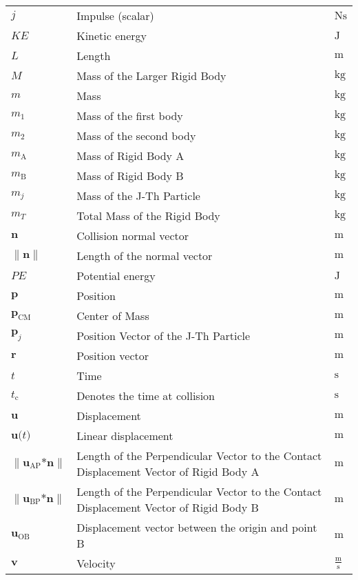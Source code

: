 \documentclass[12pt]{article}
\begin{document}
\begin{longtabu}{l X[l] l}
$j$ & Impulse (scalar) & $\text{N}\text{s}$
\\
$KE$ & Kinetic energy & ${\text{J}}$
\\
$L$ & Length & ${\text{m}}$
\\
$M$ & Mass of the Larger Rigid Body & ${\text{kg}}$
\\
$m$ & Mass & ${\text{kg}}$
\\
${m_{1}}$ & Mass of the first body & ${\text{kg}}$
\\
${m_{2}}$ & Mass of the second body & ${\text{kg}}$
\\
${m_{\text{A}}}$ & Mass of Rigid Body A & ${\text{kg}}$
\\
${m_{\text{B}}}$ & Mass of Rigid Body B & ${\text{kg}}$
\\
${m_{j}}$ & Mass of the J-Th Particle & ${\text{kg}}$
\\
${m_{T}}$ & Total Mass of the Rigid Body & ${\text{kg}}$
\\
$\symbf{n}$ & Collision normal vector & ${\text{m}}$
\\
$\|\symbf{n}\|$ & Length of the normal vector & ${\text{m}}$
\\
$PE$ & Potential energy & ${\text{J}}$
\\
$\symbf{p}$ & Position & ${\text{m}}$
\\
${\symbf{p}_{\text{CM}}}$ & Center of Mass & ${\text{m}}$
\\
${\symbf{p}_{j}}$ & Position Vector of the J-Th Particle & ${\text{m}}$
\\
$\symbf{r}$ & Position vector & ${\text{m}}$
\\
$t$ & Time & ${\text{s}}$
\\
${t_{\text{c}}}$ & Denotes the time at collision & ${\text{s}}$
\\
$\symbf{u}$ & Displacement & ${\text{m}}$
\\
$\symbf{u}\text{(}t\text{)}$ & Linear displacement & ${\text{m}}$
\\
$\|{\symbf{u}_{\text{A}\text{P}}}\text{*}\symbf{n}\|$ & Length of the Perpendicular Vector to the Contact Displacement Vector of Rigid Body A & ${\text{m}}$
\\
$\|{\symbf{u}_{\text{B}\text{P}}}\text{*}\symbf{n}\|$ & Length of the Perpendicular Vector to the Contact Displacement Vector of Rigid Body B & ${\text{m}}$
\\
${\symbf{u}_{\text{O}\text{B}}}$ & Displacement vector between the origin and point B & ${\text{m}}$
\\
$\symbf{v}$ & Velocity & $\frac{\text{m}}{\text{s}}$

\end{longtabu}
\end{document}
